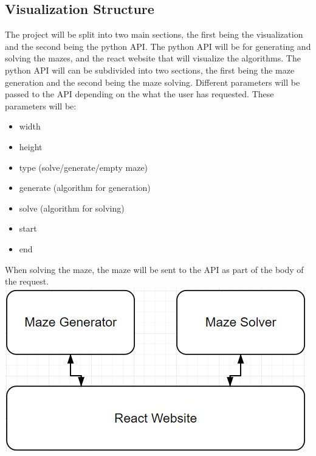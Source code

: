 \documentclass[titlepage]{article}
\begin{document}
\subsection{Visualization Structure}
The project will be split into two main sections, the first being the visualization and the second being the python API.
The python API will be for generating and solving the mazes, and the react website that will visualize the algorithms. The python API will can be subdivided into two sections, the first being the maze generation and the second being the maze solving. Different parameters will be passed to the API depending on the what the user has requested. These parameters will be:
\begin{itemize}
    \item width
    \item height
    \item type (solve/generate/empty maze)
    \item generate (algorithm for generation)
    \item solve (algorithm for solving)
    \item start
    \item end
\end{itemize} 

When solving the maze, the maze will be sent to the API as part of the body of the request.
\newline
\includegraphics[width=\linewidth]{assets/structure.jpg}
\end{document}

